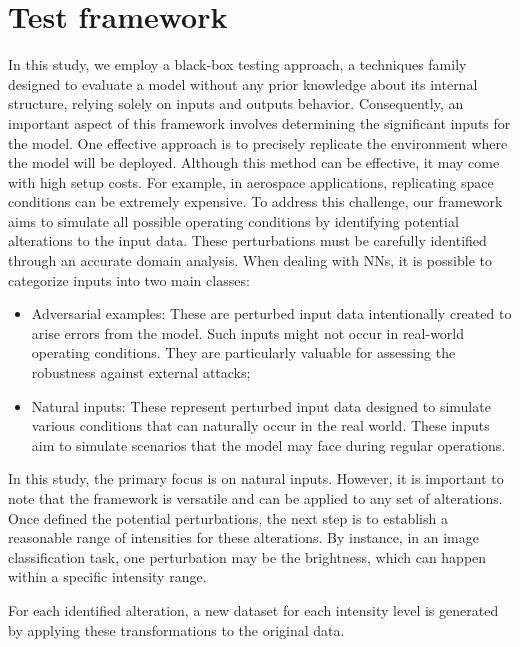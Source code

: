 \section{Test framework}

In this study, we employ a black-box testing approach, a techniques family designed to evaluate a model without any prior knowledge about its internal structure, relying solely on inputs and outputs behavior.
Consequently, an important aspect of this framework involves determining the significant inputs for the model. One effective approach is to precisely replicate the environment where the model will be deployed. Although this method can be effective, it may come with high setup costs. For example, in aerospace applications, replicating space conditions can be extremely expensive.
To address this challenge, our framework aims to simulate all possible operating conditions by identifying potential alterations to the input data. These perturbations must be carefully identified through an accurate domain analysis.
When dealing with NNs, it is possible to categorize inputs into two main classes:
\begin{itemize}
	\item Adversarial examples: These are perturbed input data intentionally created to arise errors from the model. Such inputs might not occur in real-world operating conditions. They are particularly valuable for assessing the robustness against external attacks;
	\item Natural inputs: These represent perturbed input data designed to simulate various conditions that can naturally occur in the real world. These inputs aim to simulate scenarios that the model may face during regular operations.
\end{itemize}

In this study, the primary focus is on natural inputs. However, it is important to note that the framework is versatile and can be applied to any set of alterations. Once defined the potential perturbations, the next step is to establish a reasonable range of intensities for these alterations. By instance, in an image classification task, one perturbation may be the brightness, which can happen within a specific intensity range.

For each identified alteration, a new dataset for each intensity level is generated by applying these transformations to the original data.


